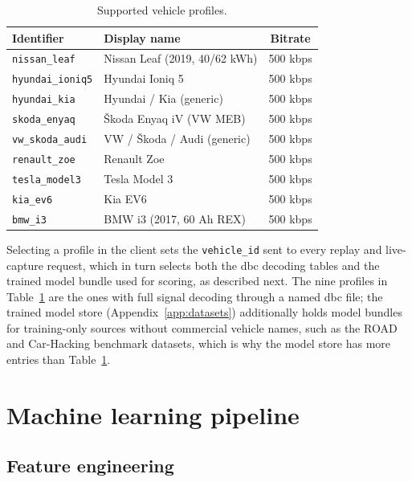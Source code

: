 \begin{table}[H]
\centering
\caption{Supported vehicle profiles.}
\label{tab:vehicles}
\begin{tabular}{@{}llc@{}}
\toprule
\textbf{Identifier} & \textbf{Display name} & \textbf{Bitrate} \\
\midrule
\texttt{nissan\_leaf}    & Nissan Leaf (2019, 40/62 kWh) & 500 kbps \\
\texttt{hyundai\_ioniq5} & Hyundai Ioniq 5               & 500 kbps \\
\texttt{hyundai\_kia}    & Hyundai / Kia (generic)       & 500 kbps \\
\texttt{skoda\_enyaq}    & Škoda Enyaq iV (VW MEB)       & 500 kbps \\
\texttt{vw\_skoda\_audi} & VW / Škoda / Audi (generic)   & 500 kbps \\
\texttt{renault\_zoe}    & Renault Zoe                   & 500 kbps \\
\texttt{tesla\_model3}   & Tesla Model 3                 & 500 kbps \\
\texttt{kia\_ev6}        & Kia EV6                       & 500 kbps \\
\texttt{bmw\_i3}         & BMW i3 (2017, 60 Ah REX)      & 500 kbps \\
\bottomrule
\end{tabular}
\end{table}

Selecting a profile in the client sets the \texttt{vehicle\_id} sent to every replay and live-capture request, which in turn selects both the \gls{dbc} decoding tables and the trained model bundle used for scoring, as described next. The nine profiles in Table~\ref{tab:vehicles} are the ones with full signal decoding through a named \gls{dbc} file; the trained model store (Appendix~\ref{app:datasets}) additionally holds model bundles for training-only sources without commercial vehicle names, such as the ROAD and Car-Hacking benchmark datasets, which is why the model store has more entries than Table~\ref{tab:vehicles}.

\section{Machine learning pipeline}

\subsection{Feature engineering}

